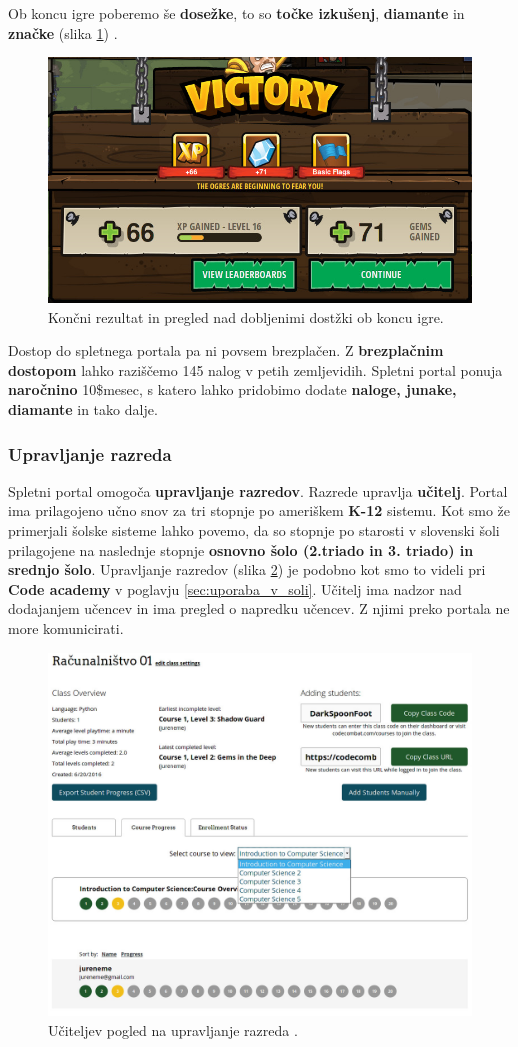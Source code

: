  Ob koncu igre poberemo še \textbf{dosežke}, to so \textbf{točke
   izkušenj}, \textbf{diamante} in \textbf{značke} (slika
 \ref{fig:web:cc:ingame:ach}) . 

\begin{figure}[h!]
  \centering
    \includegraphics [width=0.35\linewidth, keepaspectratio =
   1] {./images/sc_web/cc_ingame-ach-v02.jpg}
   \caption{Končni rezultat in pregled nad dobljenimi dostžki ob koncu
     igre\cite{web:codecombat}.}
   \label{fig:web:cc:ingame:ach}
 \end{figure}

 Dostop do spletnega portala pa ni povsem brezplačen. Z
 \textbf{brezplačnim dostopom} lahko raziščemo 145 nalog v petih
 zemljevidih. Spletni portal ponuja \textbf{naročnino} 10\$\/mesec, s
 katero lahko pridobimo dodate \textbf{naloge, junake, diamante} in
 tako dalje.
 
\subsubsection{Upravljanje razreda}
\label{sec:upravljanje_razreda}

Spletni portal omogoča \textbf{upravljanje razredov}. Razrede upravlja
\textbf{učitelj}.  Portal ima prilagojeno učno snov za tri stopnje po
ameriškem \textbf{K-12} sistemu. Kot smo že primerjali šolske sisteme
lahko povemo, da so stopnje po starosti v slovenski šoli prilagojene
na naslednje stopnje \textbf{osnovno šolo (2.triado in 3. triado) in
  srednjo šolo}. Upravljanje razredov (slika \ref{fig:web:cc:teach})
je podobno kot smo to videli pri \textbf{Code academy} v poglavju
\ref{sec:uporaba_v_soli}. Učitelj ima nadzor nad dodajanjem učencev in
ima pregled o napredku učencev. Z njimi preko portala ne more
komunicirati.

\begin{figure}[h!]
  \centering
    \includegraphics [width=0.75\linewidth, keepaspectratio =
   1] {./images/sc_web/cc_teach-clsv-v01.jpg}
   \caption{Učiteljev pogled na upravljanje razreda \cite{web:codecombat}.}
   \label{fig:web:cc:teach}
\end{figure}

